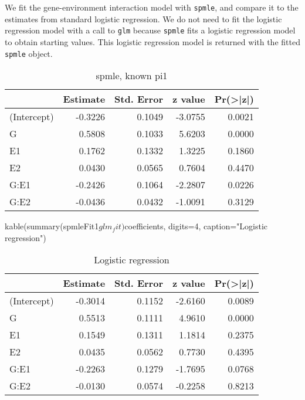 \documentclass{article}\usepackage[]{graphicx}\usepackage[]{color}
\def\code#1{\texttt{#1}}
\begin{document}
We fit the gene-environment interaction model with \code{spmle}, and compare it to the estimates from standard logistic regression.  We do not need to fit the logistic regression model with a call to \code{glm} because \code{spmle} fits a logistic regression model to obtain starting values.  This logistic regression model is returned with the fitted \code{spmle} object.
\begin{Schunk}
\begin{table}

\caption{\label{tab:unnamed-chunk-5}spmle, known pi1}
\centering
\begin{tabular}[t]{l|r|r|r|r}
\hline
  & Estimate & Std. Error & z value & Pr(>|z|)\\
\hline
(Intercept) & -0.3226 & 0.1049 & -3.0755 & 0.0021\\
\hline
G & 0.5808 & 0.1033 & 5.6203 & 0.0000\\
\hline
E1 & 0.1762 & 0.1332 & 1.3225 & 0.1860\\
\hline
E2 & 0.0430 & 0.0565 & 0.7604 & 0.4470\\
\hline
G:E1 & -0.2426 & 0.1064 & -2.2807 & 0.0226\\
\hline
G:E2 & -0.0436 & 0.0432 & -1.0091 & 0.3129\\
\hline
\end{tabular}
\end{table}

\begin{Sinput}
kable(summary(spmleFit1$glm_fit)$coefficients, digits=4, caption="Logistic regression")
\end{Sinput}
\begin{table}

\caption{\label{tab:unnamed-chunk-5}Logistic regression}
\centering
\begin{tabular}[t]{l|r|r|r|r}
\hline
  & Estimate & Std. Error & z value & Pr(>|z|)\\
\hline
(Intercept) & -0.3014 & 0.1152 & -2.6160 & 0.0089\\
\hline
G & 0.5513 & 0.1111 & 4.9610 & 0.0000\\
\hline
E1 & 0.1549 & 0.1311 & 1.1814 & 0.2375\\
\hline
E2 & 0.0435 & 0.0562 & 0.7730 & 0.4395\\
\hline
G:E1 & -0.2263 & 0.1279 & -1.7695 & 0.0768\\
\hline
G:E2 & -0.0130 & 0.0574 & -0.2258 & 0.8213\\
\hline
\end{tabular}
\end{table}

\end{Schunk}
\end{document}
